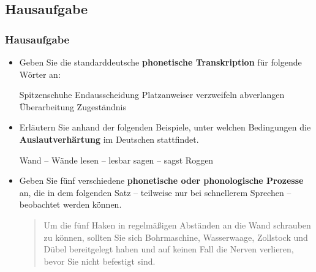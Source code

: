 {
\subsection{Hausaufgabe}


\begin{frame}
\frametitle{Hausaufgabe}

\begin{itemize}
	\item[1.]{Geben Sie die standarddeutsche \textbf{phonetische Transkription} für folgende Wörter an:}
	
	\ea \label{ex:HA1}
		\ea Spitzenschuhe
		\ex Endausscheidung
		\ex Platzanweiser
		\ex verzweifeln
		\ex abverlangen
		\ex Überarbeitung
		\ex Zugeständnis
		\z
	\z 
\end{itemize}

\end{frame}

\begin{frame}

\begin{itemize}
	\item[2.]{Erläutern Sie anhand der folgenden Beispiele, unter welchen Bedingungen die \textbf{Auslautverhärtung} im Deutschen stattfindet.}

		\ea \label{ex:HA2}
		\begin{multicols}{2}
			\ea Wand -- Wände
			\ex lesen -- lesbar
			\ex sagen -- sagst
			\ex Roggen
			\z
		\end{multicols}
		\z

	\item[3.]{Geben Sie fünf verschiedene \textbf{phonetische oder phonologische Prozesse} an, die in dem folgenden Satz -- teilweise nur bei schnellerem Sprechen -- beobachtet werden können.} 

	\ea \label{ex:HA3}
	\begin{quote}
		Um die fünf Haken in regelmäßigen Abständen an die Wand schrauben zu können, sollten Sie sich Bohrmaschine, Wasserwaage, Zollstock und Dübel bereitgelegt haben und auf keinen Fall die Nerven verlieren, bevor Sie nicht befestigt sind.
	\end{quote}
	\z
	
\end{itemize}

\end{frame}
	
\begin{frame}


\end{frame}}
